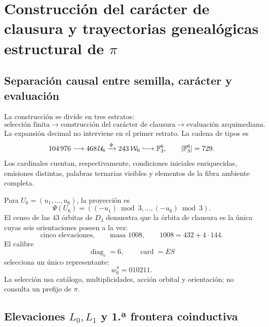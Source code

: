 \label{chap:83-09}


\iffalse

\section{Construcción del carácter de clausura y trayectorias genealógicas estructural de \(\pi\)}
\label{p12-83-c9-s1:chap:biografia-pi-autonoma}

\subsection{Separación causal entre semilla, carácter y evaluación}

La construcción se divide en tres estratos:
\[
 \text{selección finita}
 \longrightarrow
 \text{construcción del carácter de clausura}
 \longrightarrow
 \text{evaluación arquimediana}.
\]
La expansión decimal no interviene en el primer estrato. La cadena de tipos
es
\begin{equation}
 104\,976
 \longrightarrow468\,\mathcal U_6
 \xrightarrow{\Psi}243\,\mathcal W_6
 \lhook\joinrel\longrightarrow\mathbb F_3^6,
 \qquad|\mathbb F_3^6|=729.
 \label{p12-83-c9-s1:eq:cadena-tipica-pi-autonoma}
\end{equation}
Los cardinales cuentan, respectivamente, condiciones iniciales
enriquecidas, emisiones distintas, palabras ternarias visibles y elementos
de la fibra ambiente completa.

Para \(U_6=(u_1,\ldots,u_6)\), la proyección es
\[
 \Psi(U_6)=((-u_1)\bmod3,\ldots,(-u_6)\bmod3).
\]
El censo de las \(43\) órbitas de \(D_3\) demuestra que la órbita de
clausura es la única cuyas seis orientaciones poseen a la vez:
\[
 \text{cinco elevaciones},\qquad
 \text{masa }1008,\qquad
 1008=432+4\cdot144.
\]
El calibre
\[
 \operatorname{diag}_c=6,
 \qquad
 \operatorname{card}=ES
\]
selecciona un único representante:
\begin{equation}
 \boxed{w_6^\pi=010211.}
 \label{p12-83-c9-s1:eq:semilla-pi-autonoma}
\end{equation}
La selección usa catálogo, multiplicidades, acción orbital y orientación;
no consulta un prefijo de \(\pi\).

\subsection{Elevaciones \(L_0,L_1\) y 1.ª frontera coinductiva}

